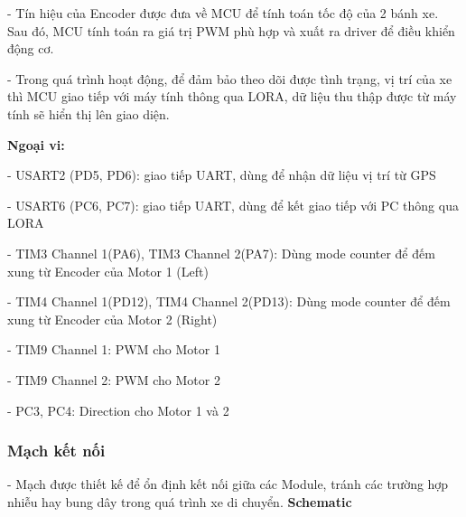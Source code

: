 \documentclass[a4paper, 12pt]{article}
\begin{document}
	- Tín hiệu của Encoder được đưa về MCU để tính toán tốc độ của 2 bánh xe. Sau đó, MCU tính toán ra giá trị PWM phù hợp và xuất ra driver để điều khiển động cơ.
	
	- Trong quá trình hoạt động, để đảm bảo theo dõi được tình trạng, vị trí của xe thì MCU giao tiếp với máy tính thông qua LORA, dữ liệu thu thập được từ máy tính sẽ hiển thị lên giao diện.
	
	\textbf{Ngoại vi:}
	
	- USART2 (PD5, PD6): giao tiếp UART, dùng để nhận dữ liệu vị trí từ GPS
	
	- USART6 (PC6, PC7): giao tiếp UART, dùng để kết giao tiếp với PC thông qua LORA
	
	- TIM3 Channel 1(PA6), TIM3 Channel 2(PA7): Dùng mode counter để đếm xung từ Encoder của Motor 1 (Left)
	
	- TIM4 Channel 1(PD12), TIM4 Channel 2(PD13): Dùng mode counter để đếm xung từ Encoder của Motor 2 (Right)
	
	- TIM9 Channel 1: PWM cho Motor 1
	
	- TIM9 Channel 2: PWM cho Motor 2
	
	- PC3, PC4: Direction cho Motor 1 và 2
	
	\subsubsection{Mạch kết nối}
	
	- Mạch được thiết kế để ổn định kết nối giữa các Module, tránh các trường hợp nhiễu hay bung dây trong quá trình xe di chuyển.
	\newpage
	\textbf{Schematic}
	
\end{document}
